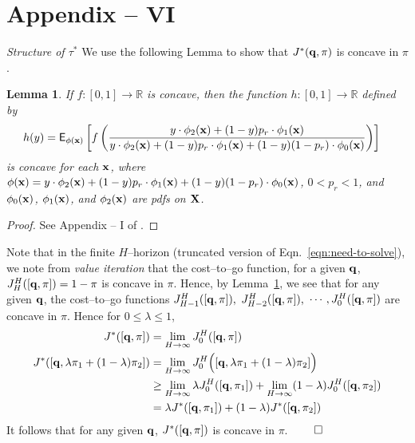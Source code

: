 \documentclass[acmtosn]{acmtrans2m}
\newtheorem{lemma}{Lemma}
\begin{document}
\section*{Appendix -- VI}
\emph{Structure of $\tau^*$}
We use the following Lemma to show that $J^*({\bf q},\pi)$ is concave in
$\pi$. 
\begin{lemma}\label{Lemma01}
If $f:[0,1] \to \mathbb{R}$ is concave, then the function 
$h:[0,1] \to \mathbb{R}$ defined by 
\begin{align*} 
h(y) & = {\mathsf E}_{\phi({\bf x})}\left[
f\left(
\frac{y \cdot \phi_2({\bf x}) + (1-y)p_r \cdot \phi_1({\bf x})}
{y \cdot\phi_2({\bf x}) + (1-y)p_r\cdot\phi_1({\bf x}) + (1-y)(1-p_r)\cdot\phi_0({\bf x})}\right) \right]   
\end{align*}
is concave for each ${\bf x}$, where $\phi({\bf x}) = y \cdot\phi_2({\bf x}) + (1-y)p_r\cdot\phi_1({\bf x}) 
+ (1-y)(1-p_r)\cdot\phi_0({\bf x})$, $0 < p_r < 1$,
and  
 $\phi_0({\bf x})$, $\phi_1({\bf x})$, and $\phi_2({\bf x})$ are pdfs on ${\bf X}$.
\end{lemma}
\begin{proof}
See Appendix -- I of \cite{premkumar-kumar08sleep-wake-scheduling}.
\end{proof}
Note that in the finite $H$--horizon (truncated version of Eqn.~\ref{eqn:need-to-solve}), 
we note from {\em value iteration} that the cost--to--go function, 
for a given ${\bf q}$, $J_H^H([{\bf q},\pi]) = 1 - \pi$ is concave in $\pi$. 
Hence, by  Lemma~\ref{Lemma01}, we see that for any given  ${\bf q}$,
the cost--to--go functions  $J_{H-1}^H([{\bf q},\pi]),$ $J_{H-2}^H([{\bf q},\pi]),$ 
$\cdots, J_0^H([{\bf q},\pi])$ are concave in $\pi$.
Hence for $0 \le \lambda \le 1$, 
\begin{align*} 
J^*([{\bf q},\pi]) & = \lim_{H \rightarrow \infty} J^H_0([{\bf q},\pi])\\
J^*([{\bf q},\lambda \pi_1 + (1-\lambda)\pi_2]) & = \lim_{H \rightarrow \infty} J^H_0\Big([{\bf q},\lambda\pi_1+(1-\lambda)\pi_2]\Big)\\
& \ge \lim_{H \rightarrow \infty} \lambda J^H_0([{\bf q},\pi_1])+ \lim_{H \rightarrow \infty} (1-\lambda)J^H_0([{\bf q},\pi_2])\\
& = \lambda J^*([{\bf q},\pi_1])+(1-\lambda)J^*([{\bf q},\pi_2])
\end{align*}
It follows that for any given ${\bf q}$, $J^*([{\bf q},\pi])$ is concave in $\pi$.
$\hfill\qed$
\end{document}
